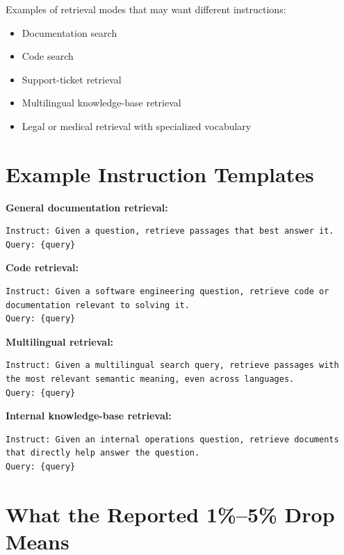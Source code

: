 Examples of retrieval modes that may want different instructions:

\begin{itemize}
    \item Documentation search
    \item Code search
    \item Support-ticket retrieval
    \item Multilingual knowledge-base retrieval
    \item Legal or medical retrieval with specialized vocabulary
\end{itemize}

\section{Example Instruction Templates}

\textbf{General documentation retrieval:}

\begin{Verbatim}
Instruct: Given a question, retrieve passages that best answer it.
Query: {query}
\end{Verbatim}

\textbf{Code retrieval:}

\begin{Verbatim}
Instruct: Given a software engineering question, retrieve code or
documentation relevant to solving it.
Query: {query}
\end{Verbatim}

\textbf{Multilingual retrieval:}

\begin{Verbatim}
Instruct: Given a multilingual search query, retrieve passages with
the most relevant semantic meaning, even across languages.
Query: {query}
\end{Verbatim}

\textbf{Internal knowledge-base retrieval:}

\begin{Verbatim}
Instruct: Given an internal operations question, retrieve documents
that directly help answer the question.
Query: {query}
\end{Verbatim}

\section{What the Reported 1\%--5\% Drop Means}

